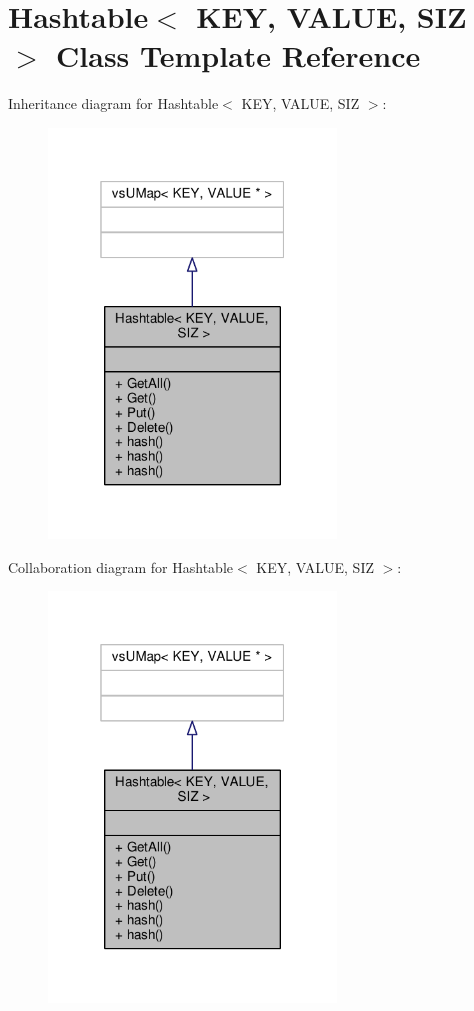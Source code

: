 \hypertarget{classHashtable}{}\section{Hashtable$<$ K\+EY, V\+A\+L\+UE, S\+IZ $>$ Class Template Reference}
\label{classHashtable}


Inheritance diagram for Hashtable$<$ K\+EY, V\+A\+L\+UE, S\+IZ $>$\+:
\nopagebreak
\begin{figure}[H]
\begin{center}
\leavevmode
\includegraphics[width=217pt]{dc/d16/classHashtable__inherit__graph}
\end{center}
\end{figure}


Collaboration diagram for Hashtable$<$ K\+EY, V\+A\+L\+UE, S\+IZ $>$\+:
\nopagebreak
\begin{figure}[H]
\begin{center}
\leavevmode
\includegraphics[width=217pt]{d9/def/classHashtable__coll__graph}
\end{center}
\end{figure}
